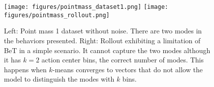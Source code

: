 \begin{figure}[htb]
\texttt{[image: figures/pointmass\_dataset1.png]}
\texttt{[image: figures/pointmass\_rollout.png]}
\centering
\caption{Left: Point mass 1 dataset without noise.
There are two modes in the behaviors presented.
Right: Rollout exhibiting a limitation of BeT in a simple scenario.
It cannot capture the two modes although it has $k=2$ action center bins, the correct number of modes.
This happens when $k$-means converges to vectors that do not allow the model to distinguish the modes with $k$ bins.
}
\label{fig:pointmass-limitation}
\end{figure}
